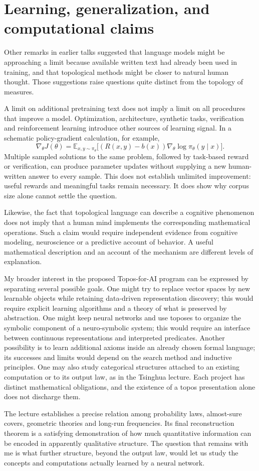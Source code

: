 \section{Learning, generalization, and computational claims}

Other remarks in earlier talks suggested that language models might be approaching a limit because available written text had already been used in training, and that topological methods might be closer to natural human thought. Those suggestions raise questions quite distinct from the topology of measures.

A limit on additional pretraining text does not imply a limit on all procedures that improve a model. Optimization, architecture, synthetic tasks, verification and reinforcement learning introduce other sources of learning signal. In a schematic policy-gradient calculation, for example,
\[
 \nabla_\theta J(\theta)
 =\mathbb E_{x,y\sim\pi_\theta}
 \bigl[(R(x,y)-b(x))\nabla_\theta\log\pi_\theta(y\mid x)\bigr].
\]
Multiple sampled solutions to the same problem, followed by task-based reward or verification, can produce parameter updates without supplying a new human-written answer to every sample. This does not establish unlimited improvement: useful rewards and meaningful tasks remain necessary. It does show why corpus size alone cannot settle the question.

Likewise, the fact that topological language can describe a cognitive phenomenon does not imply that a human mind implements the corresponding mathematical operations. Such a claim would require independent evidence from cognitive modeling, neuroscience or a predictive account of behavior. A useful mathematical description and an account of the mechanism are different levels of explanation.

My broader interest in the proposed Topos-for-AI program can be expressed by separating several possible goals. One might try to replace vector spaces by new learnable objects while retaining data-driven representation discovery; this would require explicit learning algorithms and a theory of what is preserved by abstraction. One might keep neural networks and use toposes to organize the symbolic component of a neuro-symbolic system; this would require an interface between continuous representations and interpreted predicates. Another possibility is to learn additional axioms inside an already chosen formal language; its successes and limits would depend on the search method and inductive principles. One may also study categorical structures attached to an existing computation or to its output law, as in the Tsinghua lecture. Each project has distinct mathematical obligations, and the existence of a topos presentation alone does not discharge them.

The lecture establishes a precise relation among probability laws, almost-sure covers, geometric theories and long-run frequencies. Its final reconstruction theorem is a satisfying demonstration of how much quantitative information can be encoded in apparently qualitative structure. The question that remains with me is what further structure, beyond the output law, would let us study the concepts and computations actually learned by a neural network.
